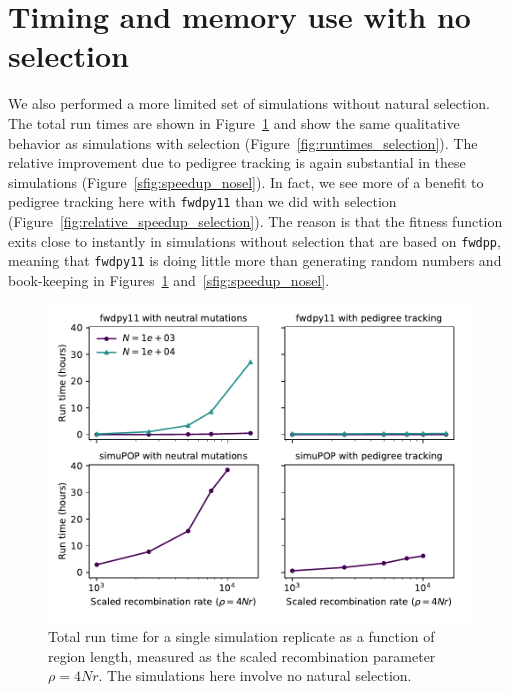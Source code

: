 \documentclass{article}
\newcommand{\fwdpp}{\texttt{fwdpp}}
\newcommand{\fwdpy}{\texttt{fwdpy11}}
\begin{document}
\newpage
\section{Timing and memory use with no selection}
\label{ss:timing_nosel}
\renewcommand{\thefigure}{D\arabic{figure}}
\setcounter{figure}{0}

We also performed a more limited set of simulations without natural selection.  The total run times are shown in
Figure~\ref{sfig:rawspeed_nosel} and show the same qualitative behavior as simulations with selection
(Figure~\ref{fig:runtimes_selection}).  The relative improvement due to pedigree tracking is again substantial in these
simulations (Figure~\ref{sfig:speedup_nosel}).  In fact, we see more of a benefit to pedigree tracking here with \fwdpy{}
than we did with selection (Figure~\ref{fig:relative_speedup_selection}).  The reason is that the fitness function exits
close to instantly in simulations without selection that are based on \fwdpp{}, meaning that \fwdpy{} is doing little
more than generating random numbers and book-keeping in Figures~\ref{sfig:rawspeed_nosel}
and~\ref{sfig:speedup_nosel}.


\begin{figure}[!h]
    \includegraphics[]{sims/rawspeed_nosel}
    \caption{\label{sfig:rawspeed_nosel}Total run time for a single simulation replicate as a function of region
        length, measured as the scaled recombination parameter $\rho = 4Nr$.  The simulations here involve no natural
    selection.}
\end{figure}
\end{document}
